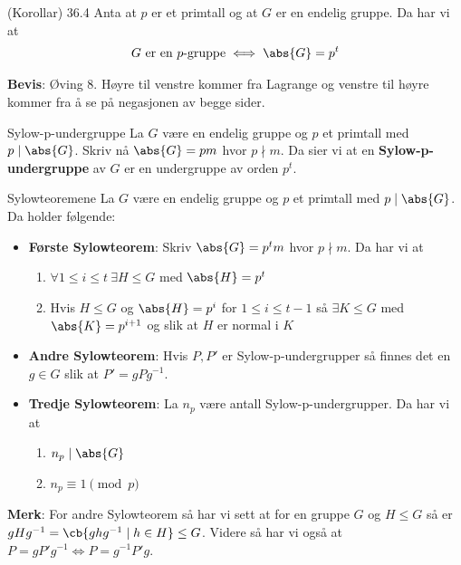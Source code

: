\begin{theorem*}{(Korollar) 36.4}{}
  Anta at $p$ er et primtall og at $G$ er en endelig gruppe. Da har vi at 
  \begin{align}
    G\text{ er en }p\text{-gruppe} \iff \abs{G}=p^t
  \end{align}
\end{theorem*}
\textbf{Bevis}: Øving 8. Høyre til venstre kommer fra Lagrange og venstre til høyre kommer fra å 
se på negasjonen av begge sider. 

\begin{definition}{Sylow-p-undergruppe}{}
  La $G$ være en endelig gruppe og $p$ et primtall med $p\mid \abs{G}$. Skriv nå $\abs{G}=pm$
  hvor $p\nmid m$. Da sier vi at en \textbf{Sylow-p-undergruppe} av $G$ er en undergruppe av
  orden $p^t$. 
\end{definition}

\begin{theorem*}{Sylowteoremene}{}
  La $G$ være en endelig gruppe og $p$ et primtall med $p\mid \abs{G}$. Da holder følgende:

  \begin{itemize}
    \item \textbf{Første Sylowteorem}: Skriv $\abs{G} = p^tm$ hvor $p\nmid m$. Da har vi at
      \begin{enumerate}[label=\alph*)]
        \item $\forall 1\leq i\leq t\ \exists H\leq G$ med $\abs{H}=p^t$
        \item Hvis $H\leq G$ og $\abs{H} = p^i$ for $1\leq i\leq t-1$ så $\exists K \leq G$ med
          $\abs{K}=p^{i+1}$ og slik at $H$ er normal i $K$
      \end{enumerate}
    \item \textbf{Andre Sylowteorem}: Hvis $P, P'$ er Sylow-p-undergrupper så finnes det en 
      $g\in G$ slik at $P'=gPg^{-1}$.
    \item \textbf{Tredje Sylowteorem}: La $n_p$ være antall Sylow-p-undergrupper. Da har vi at
      \begin{enumerate}[label=\alph*)]
        \item $n_p \mid \abs{G}$
        \item $n_p \equiv 1 \pmod{p}$
      \end{enumerate}
  \end{itemize}
\end{theorem*}

\textbf{Merk}: For andre Sylowteorem så har vi sett at for en gruppe $G$ og $H\leq G$ så er 
$gHg^{-1} = \cb{ghg^{-1}\mid h\in H}\leq G$. Videre så har vi også at 
$P=gP'g^{-1}\iff P=g^{-1}P'g$. 

